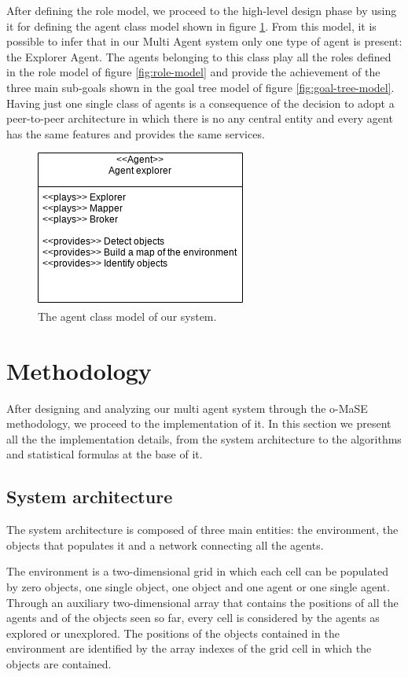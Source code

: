 \documentclass[a4paper, 10pt, conference]{ieeeconf}      %
\begin{document}
After defining the role model, we proceed to the high-level design phase by using it for defining the agent class model shown in figure \ref{fig:agent-class-model}. From this model, it is possible to infer that in our Multi Agent system only one type of agent is present: the Explorer Agent. The agents belonging to this class play all the roles defined in the role model of figure \ref{fig:role-model} and provide the achievement of the three main sub-goals shown in the goal tree model of figure \ref{fig:goal-tree-model}. Having just one single class of agents is a consequence of the decision to adopt a peer-to-peer architecture in which there is no any central entity and every agent has the same features and provides the same services. 
\begin{figure}[htb]
	\centering
	\includegraphics[width=0.5\linewidth]{img/agent-class.png}
	\caption{The agent class model of our system.}
	\label{fig:agent-class-model}
\end{figure}







\section{Methodology}
After designing and analyzing our multi agent system through the o-MaSE methodology, we proceed to the implementation of it. In this section we present all the the implementation details, from the system architecture to the algorithms and statistical formulas at the base of it. 

\subsection{System architecture}
The system architecture is composed of three main entities: the environment, the objects that populates it and a network connecting all the agents.  

The environment is a two-dimensional grid in which each cell can be populated by zero objects, one single object, one object and one agent or one single agent. Through an auxiliary two-dimensional array that contains the positions of all the agents and of the objects seen so far, every cell is considered by the agents as explored or unexplored. The positions of the objects contained in the environment are identified by the array indexes of the grid cell in which the objects are contained. 
\end{document}
